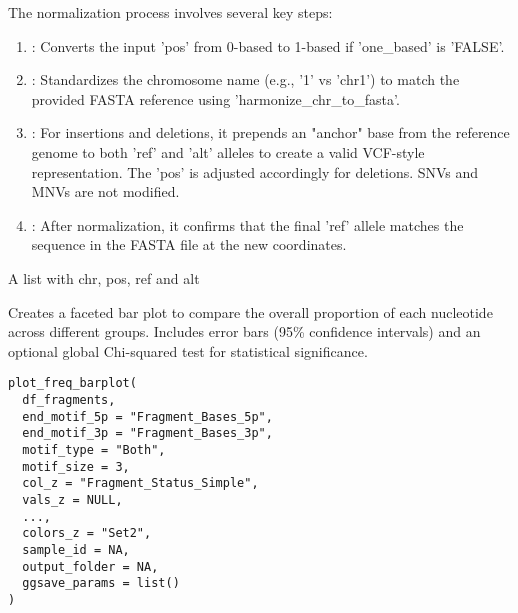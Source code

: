 \documentclass[a4paper]{book}
\begin{document}
%
\begin{Details}
The normalization process involves several key steps:
\begin{enumerate}

\item{} : Converts the input 'pos' from 0-based to 1-based if 'one\_based' is 'FALSE'.
\item{} : Standardizes the chromosome name (e.g., '1' vs 'chr1') to match the provided FASTA
reference using 'harmonize\_chr\_to\_fasta'.
\item{} : For insertions and deletions, it prepends an "anchor" base from the reference genome to both
'ref' and 'alt' alleles to create a valid VCF-style representation. The 'pos' is adjusted accordingly for
deletions. SNVs and MNVs are not modified.
\item{} : After normalization, it confirms that the final 'ref' allele matches the sequence in the FASTA file at the new coordinates.

\end{enumerate}

\end{Details}
%
\begin{Value}
A list with chr, pos, ref and alt
\end{Value}
%
\begin{Description}
Creates a faceted bar plot to compare the overall proportion of each nucleotide across different groups. Includes
error bars (95\% confidence intervals) and an optional global Chi-squared test for statistical significance.
\end{Description}
%
\begin{Usage}
\begin{verbatim}
plot_freq_barplot(
  df_fragments,
  end_motif_5p = "Fragment_Bases_5p",
  end_motif_3p = "Fragment_Bases_3p",
  motif_type = "Both",
  motif_size = 3,
  col_z = "Fragment_Status_Simple",
  vals_z = NULL,
  ...,
  colors_z = "Set2",
  sample_id = NA,
  output_folder = NA,
  ggsave_params = list()
)
\end{verbatim}
\end{Usage}
%
\end{document}
